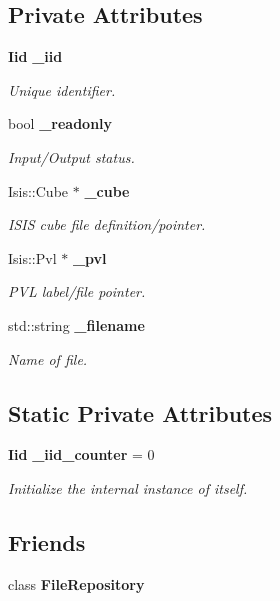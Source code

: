 \subsection*{Private Attributes}
\begin{CompactItemize}
\item 
{\bf Iid} {\bf \_\-iid}
\begin{CompactList}\small\item\em Unique identifier. \item\end{CompactList}\item 
bool {\bf \_\-readonly}
\begin{CompactList}\small\item\em Input/Output status. \item\end{CompactList}\item 
Isis::Cube $\ast$ {\bf \_\-cube}
\begin{CompactList}\small\item\em ISIS cube file definition/pointer. \item\end{CompactList}\item 
Isis::Pvl $\ast$ {\bf \_\-pvl}
\begin{CompactList}\small\item\em PVL label/file pointer. \item\end{CompactList}\item 
std::string {\bf \_\-filename}
\begin{CompactList}\small\item\em Name of file. \item\end{CompactList}\end{CompactItemize}
\subsection*{Static Private Attributes}
\begin{CompactItemize}
\item 
{\bf Iid} {\bf \_\-iid\_\-counter} = 0
\begin{CompactList}\small\item\em Initialize the internal instance of itself. \item\end{CompactList}\end{CompactItemize}
\subsection*{Friends}
\begin{CompactItemize}
\item 
class {\bf File\-Repository}
\end{CompactItemize}


